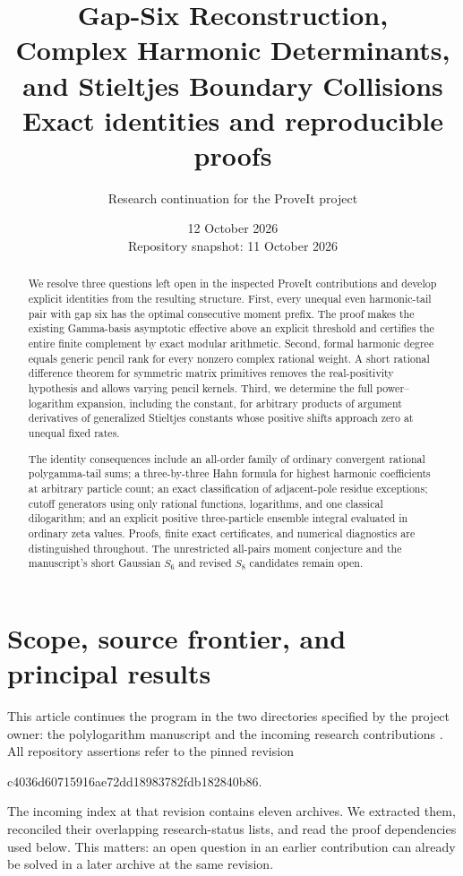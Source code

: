 \documentclass[11pt,a4paper]{article}
\title{\LARGE\bfseries Gap-Six Reconstruction,\\[3pt]
 Complex Harmonic Determinants,\\[3pt]
 and Stieltjes Boundary Collisions\\[10pt]
 \large Exact identities and reproducible proofs}
\author{Research continuation for the ProveIt project}
\date{12 October 2026\\[3pt]\small Repository snapshot: 11 October 2026}
\theoremstyle{definition}
\theoremstyle{remark}
\numberwithin{equation}{section}
\begin{document}
\maketitle
\begin{abstract}
We resolve three questions left open in the inspected ProveIt
contributions and develop explicit identities from the resulting
structure. First, every unequal even harmonic-tail pair with gap
six has the optimal consecutive moment prefix. The proof makes
the existing Gamma-basis asymptotic effective above an explicit
threshold and certifies the entire finite complement by exact
modular arithmetic. Second, formal harmonic degree equals generic
pencil rank for every nonzero complex rational weight. A short
rational difference theorem for symmetric matrix primitives removes
the real-positivity hypothesis and allows varying pencil kernels.
Third, we determine the full power--logarithm expansion, including
the constant, for arbitrary products of argument derivatives of
generalized Stieltjes constants whose positive shifts approach zero
at unequal fixed rates.

The identity consequences include an all-order family of ordinary
convergent rational polygamma-tail sums; a three-by-three Hahn
formula for highest harmonic coefficients at arbitrary particle
count; an exact classification of adjacent-pole residue exceptions;
cutoff generators using only rational functions, logarithms, and
one classical dilogarithm; and an explicit positive three-particle
ensemble integral evaluated in ordinary zeta values. Proofs,
finite exact certificates, and numerical diagnostics are distinguished
throughout. The unrestricted all-pairs moment conjecture and the
manuscript's short Gaussian $S_6$ and revised $S_8$ candidates
remain open.
\end{abstract}
\clearpage
\begingroup
\small
\tableofcontents
\endgroup
\clearpage
\section{Scope, source frontier, and principal results}
\label{scope:section}

This article continues the program in the two directories specified
by the project owner: the polylogarithm manuscript and the incoming
research contributions \cite{RepoManuscript,RepoIncoming}. All
repository assertions refer to the pinned revision
\begin{center}\small\ttfamily
c4036d60715916ae72dd18983782fdb182840b86.
\end{center}
The incoming index at that revision contains eleven archives.
We extracted them, reconciled their overlapping research-status
lists, and read the proof dependencies used below. This matters:
an open question in an earlier contribution can already be solved
in a later archive at the same revision.
\end{document}
